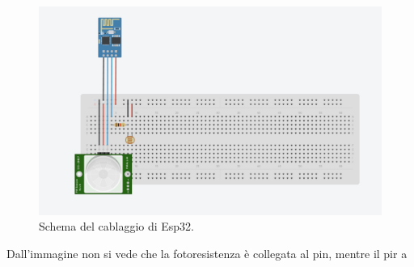 \documentclass[a4paper,12pt]{report}
\begin{document}
\begin{figure}[H]
\centering
\includegraphics[width=\textwidth]{img/wire-esp.png}
\caption{Schema del cablaggio di Esp32.}
\label{fig:wiringsesp}
\end{figure}

Dall'immagine non si vede che la fotoresistenza è collegata al pin, mentre il pir a 
\end{document}
